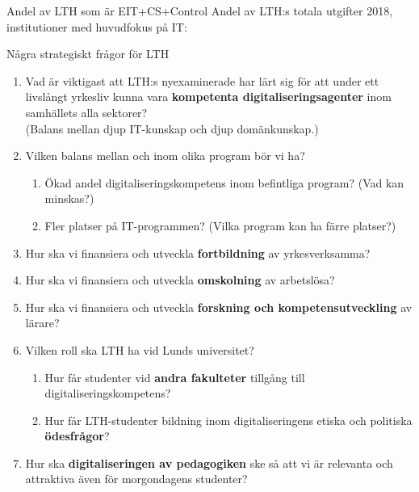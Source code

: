 \documentclass[aspectratio=169]{beamer}
\newenvironment{Slide}[1]%
  {\begin{frame}[environment=Slide]{#1}}
  {\end{frame}}%
\begin{document}
\begin{Slide}{Andel av LTH som är EIT+CS+Control}
Andel av LTH:s totala utgifter 2018, institutioner med huvudfokus på IT:
\end{Slide}

\begin{Slide}{Några strategiskt frågor för LTH}
  \begin{enumerate}\small
    \item Vad är viktigast att LTH:s nyexaminerade har lärt sig för att under ett livslångt yrkesliv kunna vara \textbf{kompetenta digitaliseringsagenter} inom samhällets alla sektorer? \\(Balans mellan djup IT-kunskap och djup domänkunskap.)
    \item Vilken balans mellan och inom olika program bör vi ha?
    \begin{enumerate}
      \item Ökad andel digitaliseringskompetens inom befintliga program? (Vad kan minskas?)
      \item Fler platser på IT-programmen? (Vilka program kan ha färre platser?)
    \end{enumerate}  
    \item Hur ska vi finansiera och utveckla \textbf{fortbildning} av yrkesverksamma?
    \item Hur ska vi finansiera och utveckla \textbf{omskolning} av arbetslösa?
    \item Hur ska vi finansiera och utveckla  \textbf{forskning och kompetensutveckling} av lärare?
    \item Vilken roll ska LTH ha vid Lunds universitet?
    \begin{enumerate}
      \item Hur får studenter vid \textbf{andra fakulteter} tillgång till digitaliseringskompetens?
      \item Hur får LTH-studenter bildning inom digitaliseringens etiska och politiska \textbf{ödesfrågor}?
    \end{enumerate}  
    \item Hur ska \textbf{digitaliseringen av pedagogiken} ske så att vi är relevanta och attraktiva även för morgondagens studenter?
  \end{enumerate}  
\end{Slide}
\end{document}
